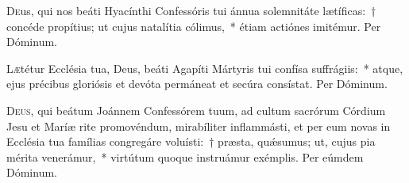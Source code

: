 \documentclass[vesperale_romanum.tex]{subfiles}
\begin{document}
\commemoration

\myrule
\newpage

\duplexmtv


\oratio

\lettrine{D}{e}us, qui nos beáti Hyacínthi Confessóris tui ánnua sole\-mnitáte lætíficas:~† concéde propítius; ut cujus natalítia cólimus,~* étiam actiónes imitémur. Per Dóminum.


\myrule


\semiduplex



\oratio
\lettrine{L}{æ}tétur Ecclésia tua, Deus, beáti Agapíti Mártyris tui confísa suffrágiis:~* atque, ejus précibus gloriósis et devóta permáneat et secúra consístat. Per Dóminum.


\myrule

\duplex
\oratio

\lettrine{D}{eus}, qui beátum Joánnem Confessórem tuum, ad cultum sacrórum Córdium Jesu et Maríæ rite promovéndum, mirabíliter inflammásti, et per eum novas in Ecclésia tua famílias congregáre voluísti:~† præsta, quǽsumus; ut, cujus pia mérita venerámur,~* virtútum quoque instruámur exémplis.
Per eúmdem Dóminum.


\myrule

\newpage

\duplex


\oratio
\end{document}
